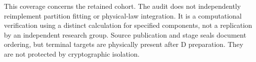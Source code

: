 This coverage concerns the retained cohort. The audit does not independently reimplement partition fitting or physical-law integration. It is a computational verification using a distinct calculation for specified components, not a replication by an independent research group. Source publication and stage seals document ordering, but terminal targets are physically present after D preparation. They are not protected by cryptographic isolation.

\begin{table}[htbp]\centering\small
\caption{Whole-search resource measurements. Wall times are worker sums; peak RSS is per worker. State sizes include all candidate models. Shared computations prevent these totals from identifying isolated K versus R deployment costs.}\label{supp:resources}
\end{table}
\FloatBarrier
